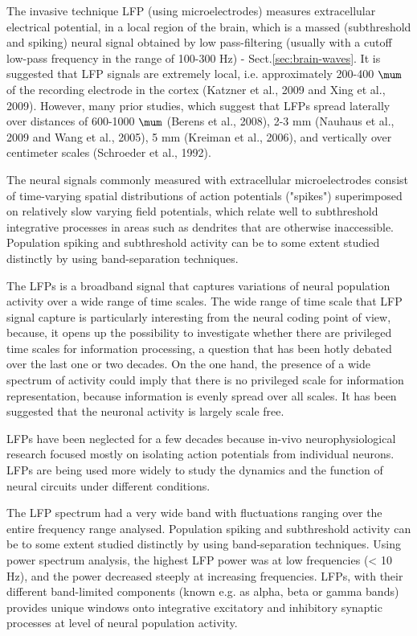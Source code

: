 The invasive technique LFP (using microelectrodes) measures extracellular
electrical potential, in a local region of the brain,  which is a massed
(subthreshold and spiking) neural signal obtained by low pass-filtering (usually
with a cutoff low-pass frequency in the range of 100-300 Hz) -
Sect.\ref{sec:brain-waves}.
It is suggested that LFP signals are extremely local, i.e. approximately 200-400
$\mum$ of the recording electrode in the cortex (Katzner et al., 2009 and Xing
et al., 2009). However,
 many prior studies, which suggest that LFPs spread laterally over distances of
600-1000 $\mum$ (Berens et al., 2008), 2-3 mm (Nauhaus et al., 2009 and Wang et
al., 2005), 5 mm (Kreiman et al., 2006), and vertically over centimeter scales
(Schroeder et al., 1992).



The neural signals commonly measured with extracellular microelectrodes consist
of time-varying spatial distributions of action potentials ("spikes")
superimposed on relatively slow varying field potentials, which relate well to
subthreshold integrative processes in areas such as dendrites that are otherwise
inaccessible.  Population spiking and subthreshold activity can be to some
extent studied distinctly by using band-separation techniques.

The LFPs is a broadband signal that captures variations of neural population
activity over a wide range of time scales. The wide range of time scale that LFP
signal capture is particularly interesting from the neural coding point of view,
because, it opens up the possibility to investigate whether there are privileged
time scales for information processing, a question that has been hotly debated
over the last one or two decades.
On the one hand, the presence of a wide spectrum of activity could imply that
there is no privileged scale for information representation, because information
is evenly spread over all scales. It has been suggested that the neuronal
activity is largely scale free.

LFPs have been neglected for a few decades because in-vivo neurophysiological
research focused mostly on isolating action potentials from individual neurons.
LFPs are being used more widely to study the dynamics and the function of neural
circuits under different conditions. 

The LFP spectrum had a very wide band with fluctuations ranging over the entire
frequency range analysed.  Population spiking and subthreshold activity can be
to some extent studied distinctly by using band-separation techniques.
Using power spectrum analysis, the highest LFP power was at low frequencies (<
10 Hz), and the power decreased steeply at increasing frequencies.
LFPs, with their different band-limited components (known e.g. as alpha, beta or
gamma bands) provides unique windows onto integrative excitatory and inhibitory
synaptic processes at level of neural population activity.

